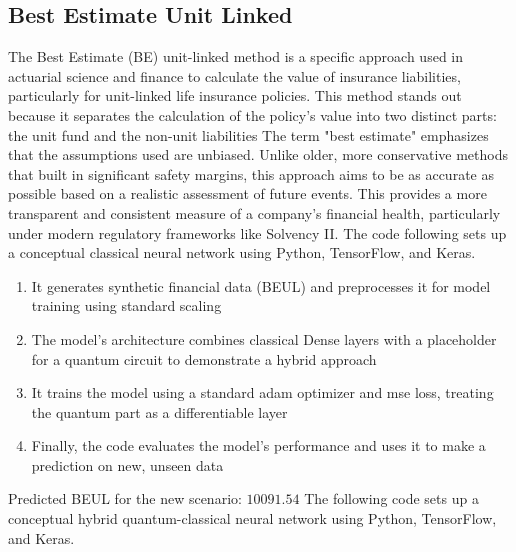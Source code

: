 \documentclass{article}
\begin{document}
\subsection{Best Estimate Unit Linked}
The Best Estimate (BE) unit-linked method is a specific approach used in actuarial science and finance to calculate the value of insurance liabilities, particularly for unit-linked life insurance policies. This method stands out because it separates the calculation of the policy's value into two distinct parts: the unit fund and the non-unit liabilities
The term "best estimate" emphasizes that the assumptions used are unbiased. Unlike older, more conservative methods that built in significant safety margins, this approach aims to be as accurate as possible based on a realistic assessment of future events. This provides a more transparent and consistent measure of a company's financial health, particularly under modern regulatory frameworks like Solvency II.
The code following sets up a conceptual classical neural network using Python, TensorFlow, and Keras.
\begin{enumerate}
    \item It generates synthetic financial data (BEUL) and preprocesses it for model training using standard scaling
    \item The model's architecture combines classical Dense layers with a placeholder for a quantum circuit to demonstrate a hybrid approach
    \item It trains the model using a standard adam optimizer and mse loss, treating the quantum part as a differentiable layer
    \item Finally, the code evaluates the model's performance and uses it to make a prediction on new, unseen data
\end{enumerate}
Predicted BEUL for the new scenario: $10091.54$
The following code sets up a conceptual hybrid quantum-classical neural network using Python, TensorFlow, and Keras.
\end{document}
